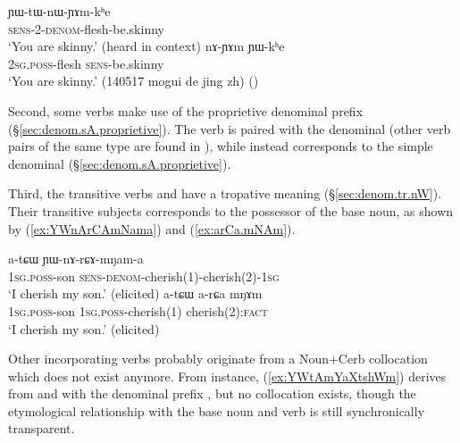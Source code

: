 \begin{exe}
\ex 
\begin{xlist}
\ex \label{ex:YWtWnWYAmkhe}
\gll ɲɯ-tɯ-nɯ-ɲɤm-kʰe \\
\textsc{sens}-2-\textsc{denom}-flesh-be.skinny \\
\glt `You are skinny.' (heard in context)
\ex \label{ex:nAYAm.YWkhe}
\gll  nɤ-ɲɤm ɲɯ-kʰe \\
\textsc{2sg}.\textsc{poss}-flesh \textsc{sens}-be.skinny \\
\glt `You are skinny.' (140517 mogui de jing zh)
()
\end{xlist}
\end{exe}

 

Second, some verbs make use of the   proprietive denominal prefix (§\ref{sec:denom.sA.proprietive}). The verb  is paired with the  denominal  (other verb pairs of the same type are found in ), while  instead corresponds to the simple denominal  (§\ref{sec:denom.sA.proprietive}).

Third, the transitive verbs   and  have a tropative meaning (§\ref{sec:denom.tr.nW}). Their transitive subjects corresponds to the possessor of the base noun, as shown by (\ref{ex:YWnArCAmNama}) and (\ref{ex:arCa.mNAm}).

\begin{exe}
\ex 
\begin{xlist}
\ex \label{ex:YWnArCAmNama}
\gll a-tɕɯ ɲɯ-nɤ-rɕɤ-mŋam-a \\
\textsc{1sg}.\textsc{poss}-son \textsc{sens}-\textsc{denom}-cherish(1)-cherish(2)-\textsc{1sg} \\
\glt `I cherish my son.' (elicited)
\ex \label{ex:arCa.mNAm}
\gll  a-tɕɯ a-rɕa mŋɤm \\
\textsc{1sg}.\textsc{poss}-son  \textsc{1sg}.\textsc{poss}-cherish(1)  cherish(2):\textsc{fact}   \\
\glt `I cherish my son.' (elicited)
\end{xlist}
\end{exe}

Other incorporating verbs probably originate from a Noun+Cerb collocation which does not exist anymore. From instance,  (\ref{ex:YWtAmYaXtshWm}) derives from  and  with the denominal prefix , but no collocation  exists, though the etymological relationship with the base noun and verb is still synchronically transparent.

